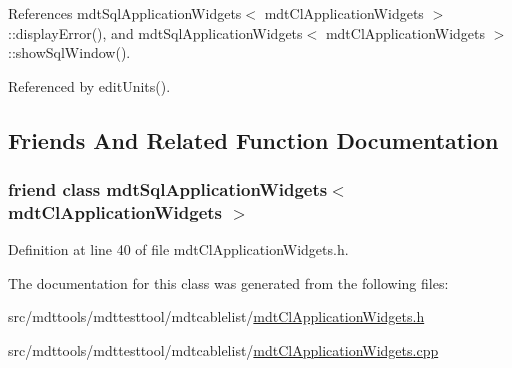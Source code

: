 References mdt\-Sql\-Application\-Widgets$<$ mdt\-Cl\-Application\-Widgets $>$\-::display\-Error(), and mdt\-Sql\-Application\-Widgets$<$ mdt\-Cl\-Application\-Widgets $>$\-::show\-Sql\-Window().



Referenced by edit\-Units().



\subsection{Friends And Related Function Documentation}
\hypertarget{classmdt_cl_application_widgets_a2d812571762985375915ab7af33a4ff5}{
\subsubsection[{mdt\-Sql\-Application\-Widgets$<$ mdt\-Cl\-Application\-Widgets $>$}]{\setlength{\rightskip}{0pt plus 5cm}friend class {\bf mdt\-Sql\-Application\-Widgets}$<$ {\bf mdt\-Cl\-Application\-Widgets} $>$\hspace{0.3cm}{\ttfamily [friend]}}}\label{classmdt_cl_application_widgets_a2d812571762985375915ab7af33a4ff5}


Definition at line 40 of file mdt\-Cl\-Application\-Widgets.\-h.



The documentation for this class was generated from the following files\-:\begin{DoxyCompactItemize}
\item 
src/mdttools/mdttesttool/mdtcablelist/\hyperlink{mdt_cl_application_widgets_8h}{mdt\-Cl\-Application\-Widgets.\-h}\item 
src/mdttools/mdttesttool/mdtcablelist/\hyperlink{mdt_cl_application_widgets_8cpp}{mdt\-Cl\-Application\-Widgets.\-cpp}\end{DoxyCompactItemize}
